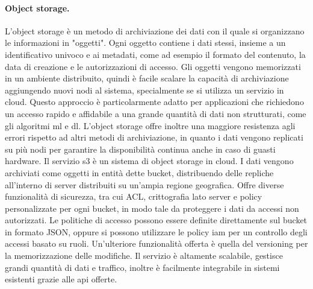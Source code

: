\documentclass[12pt,a4paper,fleqn,titlepage]{report}
\begin{document}
        \paragraph{Object storage.}
        L'object storage è un metodo di archiviazione dei dati con il quale si organizzano le informazioni in "oggetti". Ogni oggetto contiene i dati stessi, insieme a un identificativo univoco e ai metadati, come ad esempio il formato del contenuto, la data di creazione e le autorizzazioni di accesso. Gli oggetti vengono memorizzati in un ambiente distribuito, quindi è facile scalare la capacità di archiviazione aggiungendo nuovi nodi al sistema, specialmente se si utilizza un servizio in cloud. Questo approccio è particolarmente adatto per applicazioni che richiedono un accesso rapido e affidabile a una grande quantità di dati non strutturati, come gli algoritmi \gls{ml} e \gls{dl}. L'object storage offre inoltre una maggiore resistenza agli errori rispetto ad altri metodi di archiviazione, in quanto i dati vengono replicati su più nodi per garantire la disponibilità continua anche in caso di guasti hardware.
        Il servizio \gls{s3} è un sistema di object storage in cloud. I dati vengono archiviati come oggetti in entità dette bucket, distribuendo delle repliche all'interno di server distribuiti su un'ampia regione geografica.
        Offre diverse funzionalità di sicurezza, tra cui ACL, crittografia lato server e policy personalizzate per ogni bucket, in modo tale da proteggere i dati da accessi non autorizzati. Le politiche di accesso possono essere definite direttamente sul bucket in formato JSON, oppure si possono utilizzare le policy \gls{iam} per un controllo degli accessi basato su ruoli. Un'ulteriore funzionalità offerta è quella del versioning per la memorizzazione delle modifiche. Il servizio è altamente scalabile, gestisce grandi quantità di dati e traffico, inoltre è facilmente integrabile in sistemi esistenti grazie alle \gls{api} offerte.
\end{document}
